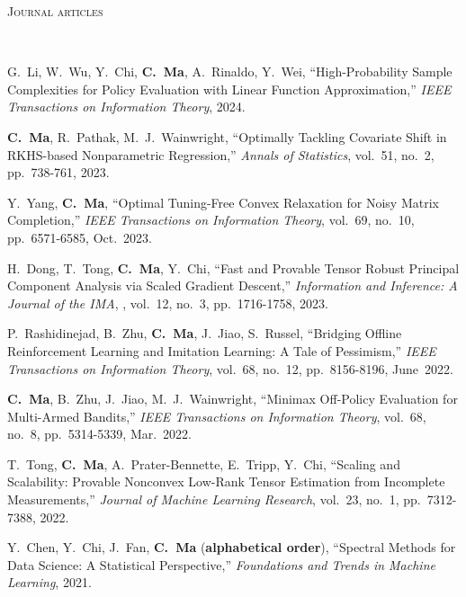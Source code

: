 \documentclass[a4paper, 10pt]{article}
\newenvironment{changemargin}[2]{%
  \begin{list}{}{%
    \setlength{\topsep}{0pt}%
    \setlength{\leftmargin}{#1}%
    \setlength{\rightmargin}{#2}%
    \setlength{\listparindent}{\parindent}%
    \setlength{\itemindent}{\parindent}%
    \setlength{\parsep}{\parskip}%
  }%
  \item[]}{\end{list}
}
\newcommand{\lineover}{
	\begin{changemargin}{-0.05in}{-0.05in}
		\vspace*{-8pt}
		\hrulefill \\
		\vspace*{-2pt}
	\end{changemargin}
}
\newcommand{\header}[1]{
	\begin{changemargin}{-0.5in}{-0.5in}
		\scshape{#1}\\
  	\lineover
	\end{changemargin}
}
\newenvironment{body} {
	\vspace*{-16pt}
	\begin{changemargin}{-0.3in}{-0.5in}
  }	
	{\end{changemargin}
}
\begin{document}
\bigskip
\header{\LARGE{Journal articles}}
\begin{body}
\vspace{18pt}
\begin{enumerate}[label={[{J}{{\arabic*}}]}]

\item G.~Li, W.~Wu, Y.~Chi, \textbf{C.~Ma}, A.~Rinaldo, Y.~Wei, ``High-Probability Sample Complexities for Policy Evaluation with Linear Function Approximation,'' \emph{IEEE Transactions on Information Theory}, 2024.


\item \textbf{C.~Ma}, R.~Pathak, M.~J.~Wainwright, ``Optimally Tackling Covariate Shift in RKHS-based Nonparametric Regression,'' \emph{Annals of Statistics},  vol.~51, no.~2, pp.~738-761, 2023.

	
\item Y.~Yang, \textbf{C.~Ma}, {``Optimal Tuning-Free Convex Relaxation for Noisy Matrix Completion,''}  \emph{IEEE Transactions on Information Theory}, vol.~69, no.~10, pp.~6571-6585, Oct.~2023. \\

\item {H.~Dong, T.~Tong, \textbf{C.~Ma}, Y.~Chi, ``Fast and Provable Tensor Robust Principal Component Analysis via Scaled Gradient Descent,''} \emph{Information and Inference: A Journal of the IMA}, , vol.~12, no.~3, pp.~1716-1758, 2023.


\item P.~Rashidinejad, B.~Zhu, \textbf{C.~Ma}, J.~Jiao, S.~Russel, {``Bridging Offline Reinforcement Learning and Imitation Learning: A Tale of Pessimism,''} \emph{IEEE Transactions on Information Theory},  vol.~68, no.~12, pp.~8156-8196, June~2022.

\item \textbf{C.~Ma}, B.~Zhu, J.~Jiao, M.~J.~Wainwright, {``Minimax Off-Policy Evaluation for Multi-Armed Bandits,''} \emph{IEEE Transactions on Information Theory}, vol.~68, no.~8, pp.~5314-5339, Mar.~2022. \\


\item T.~Tong, \textbf{C.~Ma}, A.~Prater-Bennette, E.~Tripp, Y.~Chi, {``Scaling and Scalability: Provable Nonconvex Low-Rank Tensor
Estimation from Incomplete Measurements,''} \emph{Journal of Machine Learning Research}, vol.~23, no.~1, pp.~7312-7388, 2022. \\



\item Y.~Chen, Y.~Chi, J.~Fan, \textbf{C.~Ma} (\textbf{alphabetical order}), {``Spectral Methods for Data Science: A Statistical Perspective,''}  \emph{Foundations and Trends in Machine Learning}, 2021. \\


\end{enumerate}
\end{body}
\end{document}
